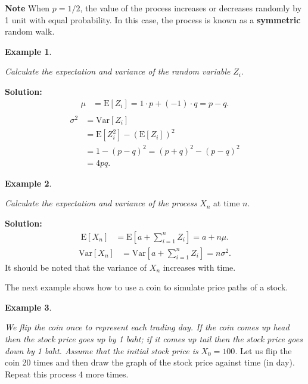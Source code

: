 \documentclass[
]{book}
\theoremstyle{definition}
\theoremstyle{definition}
\newtheorem{example}{Example}[chapter]
\theoremstyle{definition}
\theoremstyle{definition}
\theoremstyle{remark}
\begin{document}
\textbf{Note} When \(p = 1/2\), the value of the process increases or decreases
randomly by 1 unit with equal probability. In this case, the process is
known as a \textbf{symmetric} random walk.

\begin{example}
\protect\hypertarget{exm:unlabeled-div-69}{}\label{exm:unlabeled-div-69}

\emph{Calculate the expectation and variance of the random variable} \(Z_i\).

\end{example}

\textbf{Solution:} \[\begin{aligned}
    \mu &= \mathrm{E}[Z_i] = 1\cdot p + (-1) \cdot q = p - q.\\\end{aligned}\]
\[\begin{aligned}
    \sigma^2 &= \mathrm{Var}[Z_i] \\
            &=\mathrm{E}[Z_i^2] - (\mathrm{E}[Z_i] )^2 \\
            &= 1 - (p-q)^2  = (p+q)^2 - (p-q)^2\\
            &= 4pq.\end{aligned}\]

\begin{example}
\protect\hypertarget{exm:unlabeled-div-70}{}\label{exm:unlabeled-div-70}

\emph{Calculate the expectation and variance of the process} \(X_n\) at time
\(n\).

\end{example}

\textbf{Solution:} \[\begin{aligned}
     \mathrm{E}[X_n] &=  \mathrm{E}[a + \sum_{i=1}^n Z_i] = a + n\mu.\end{aligned}\]
\[\begin{aligned}
    \mathrm{Var}[X_n]&= \mathrm{Var}[a + \sum_{i=1}^n Z_i]  = n \sigma^2.\end{aligned}\]
It should be noted that the variance of \(X_n\) increases with time.

The next example shows how to use a coin to simulate price paths of a
stock.

\begin{example}
\protect\hypertarget{exm:unlabeled-div-71}{}\label{exm:unlabeled-div-71}

\emph{We flip the coin once to represent each trading day. If the coin comes
up head then the stock price goes up by 1 baht; if it comes up tail then
the stock price goes down by 1 baht. Assume that the initial stock price
is} \(X_0 = 100\). Let us flip the coin 20 times and then draw the graph
of the stock price against time (in day). Repeat this process 4 more
times.

\end{example}
\end{document}
